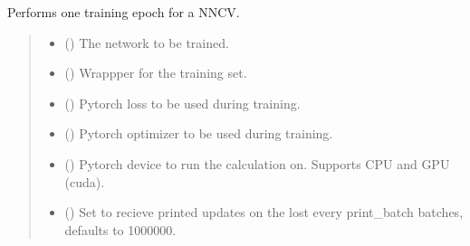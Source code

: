 \documentclass[a4paper,10pt,english]{report}
\begin{document}
\begin{fulllineitems}
\label{\detokenize{NNucleate:NNucleate.training.train_linear}}
\pysigstartsignatures
{}
\pysigstopsignatures
\sphinxAtStartPar
Performs one training epoch for a NNCV.
\begin{quote}\begin{description}
\begin{itemize}
\item {} 
\sphinxAtStartPar
{} ({\hyperref[\detokenize{NNucleate:NNucleate.models.NNCV}]{}}) \textendash{} The network to be trained.

\item {} 
\sphinxAtStartPar
{} () \textendash{} Wrappper for the training set.

\item {} 
\sphinxAtStartPar
{} () \textendash{} Pytorch loss to be used during training.

\item {} 
\sphinxAtStartPar
{} () \textendash{} Pytorch optimizer to be used during training.

\item {} 
\sphinxAtStartPar
{} () \textendash{} Pytorch device to run the calculation on. Supports CPU and GPU (cuda).

\item {} 
\sphinxAtStartPar
{} (\sphinxstyleliteralemphasis{\sphinxupquote{, }}) \textendash{} Set to recieve printed updates on the lost every print\_batch batches, defaults to 1000000.


\end{itemize}
\end{description}
\end{quote}
\end{fulllineitems}
\end{document}
